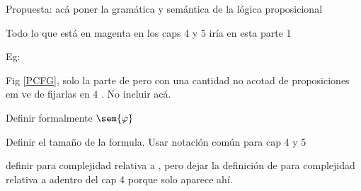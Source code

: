 

  \color{magenta}
  Propuesta: acá poner la gramática y semántica de la lógica proposicional

  Todo lo que está en magenta en los caps 4 y 5 iría en esta parte 1

  Eg:
  
  Fig \ref{PCFG}, solo la parte de \grambool pero con una cantidad no acotad de proposiciones em ve de fijarlas en 4 . No incluir \gramboolxor acá.

  Definir formalmente $\sem{\varphi}$

  Definir el tamaño de la formula. Usar notación común para cap 4 y 5

  definir  \mdl{\grambool} para complejidad relativa a \grambool, pero dejar la definición de
    \mdl{\gramboolxor} para complejidad relativa a \gramboolxor adentro del cap 4 porque solo aparece ahí. 





  \color{black}